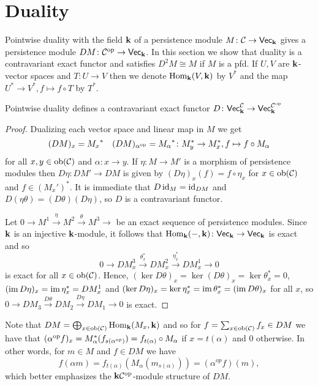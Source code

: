 \section{Duality}\label{sec:duality}
Pointwise duality with the field $\mathbf{k}$ of a persistence module $M\colon \mathcal{C}\to\normalfont\mathsf{Vec}_{\mathbf{k}}$ gives a persistence module $DM\colon\mathcal{C}^{\text{op}}\to\normalfont\mathsf{Vec}_{\mathbf{k}}$.
In this section we show that duality is a contravariant exact functor and satisfies $D^2M\cong M$ if $M$ is a pfd.
If $U,V$ are $\mathbf{k}$-vector spaces and $T\colon U\to V$ then we denote $\operatorname{Hom}_{\mathbf{k}}(V,\mathbf{k})$ by $V^*$ and the map $U^*\to V^*, f\mapsto f\circ T$ by $T^*$.
\begin{lemma}\label{lemma:dualityIsExact}
    Pointwise duality defines a contravariant exact functor $D\colon\normalfont\mathsf{Vec}_{\mathbf{k}}^{\mathcal{C}}\to\normalfont\mathsf{Vec}_{\mathbf{k}}^{\mathcal{C}^{\text{op}}}$
\end{lemma}
\begin{proof}
    Dualizing each vector space and linear map in $M$ we get
    \[ (DM)_x={M_x}^*\quad(DM)_{\alpha^{\text{op}}}={M_\alpha}^*\colon M_y^*\to M_x^*, f\mapsto f\circ M_\alpha \]
    for all $x,y\in\operatorname{ob}(\mathcal{C})$ and $\alpha\colon x\to y$. 
    If $\eta\colon M\to M'$ is a morphism of persistence modules then $D\eta\colon DM'\to DM$ is given by $(D\eta)_x(f)=f\circ \eta_x$ for $x\in\operatorname{ob}(\mathcal{C})$ and $f\in (M_x')^*$.
    It is immediate that $D\operatorname{id}_M=\operatorname{id}_{DM}$ and $D(\eta\theta)=(D\theta)(D\eta)$, so $D$ is a contravariant functor.

    Let $0\to M^1\xrightarrow{\eta} M^2\xrightarrow{\theta} M^3\to $ be an exact sequence of persistence modules. 
    Since $\mathbf{k}$ is an injective $\mathbf{k}$-module, it follows that $\operatorname{Hom}_{\mathbf{k}}(-, \mathbf{k})\colon \normalfont\mathsf{Vec}_{\mathbf{k}}\to\normalfont\mathsf{Vec}_{\mathbf{k}}$ is exact and so
    \[ 0\to DM^3_x\xrightarrow{\theta_x^*} DM^2_x\xrightarrow{\eta_x^*}DM^1_x\to 0 \]
    is exact for all $x\in\operatorname{ob}(\mathcal{C})$. 
    Hence, $(\ker D\theta)_x=\ker (D\theta)_x=\ker\theta_x^*=0$, $(\operatorname{im} D\eta)_x=\operatorname{im}\eta_x^*=DM^1_x$ and $(\ker D\eta)_x=\ker\eta_x^*=\operatorname{im}\theta_x^*=(\operatorname{im} D\theta)_x$ for all $x$, so $0\to DM_3\xrightarrow{D\theta} DM_2\xrightarrow{D\eta} DM_1\to 0$ is exact.
\end{proof}


Note that $DM=\bigoplus_{x\in\operatorname{ob}(\mathcal{C})}\operatorname{Hom}_{\mathbf{k}}(M_x,\mathbf{k})$ and so for $f=\sum_{x\in\operatorname{ob}(\mathcal{C})}f_x\in DM$ we have that $(\alpha^{\text{op}}f)_x=M_\alpha^*(f_{s(\alpha^{op})})=f_{t(\alpha)}\circ M_\alpha$ if $x=t(\alpha)$ and 0 otherwise.
In other words, for $m\in M$ and $f\in DM$ we have
\[ f(\alpha m)=f_{t(\alpha)}(M_\alpha(m_{s(\alpha)}))=(\alpha^{op}f)(m), \]
which better emphasizes the $\mathbf{k}\mathcal{C}^{\text{op}}$-module structure of $DM$.

